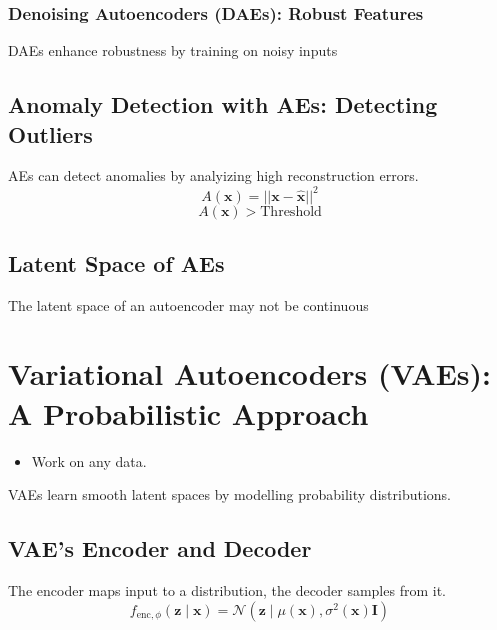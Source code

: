 \documentclass{article}
\begin{document}
\subsubsection{Denoising Autoencoders (DAEs): Robust Features}
\begin{definition}
    DAEs enhance robustness by training on noisy inputs
\end{definition}

\subsection{Anomaly Detection with AEs: Detecting Outliers}
\begin{definition}
    AEs can detect anomalies by analyizing high reconstruction errors.
    \begin{equation}
        A(\mathbf{x}) = ||\mathbf{x} - \hat{\mathbf{x}}||^2
    \end{equation}
    \begin{equation}
        A(\mathbf{x}) > \text{Threshold}
    \end{equation}
\end{definition}

\subsection{Latent Space of AEs}
\begin{definition}
    The latent space of an autoencoder may not be continuous
\end{definition}

\section{Variational Autoencoders (VAEs): A Probabilistic Approach}
\begin{summary}
    \begin{itemize}
        \item Work on any data. 
    \end{itemize}
\end{summary}
\begin{definition}
    VAEs learn smooth latent spaces by modelling probability distributions.
\end{definition}

\subsection{VAE's Encoder and Decoder}
\begin{definition}
    The encoder maps input to a distribution, the decoder samples from it.
    \begin{equation}
        f_{\text{enc},\phi} (\mathbf{z} \mid \mathbf{x}) = \mathcal{N}(\mathbf{z} \mid \mu(\mathbf{x}), \sigma^2(\mathbf{x}) \mathbf{I})
    \end{equation}
\end{definition}
\end{document}
